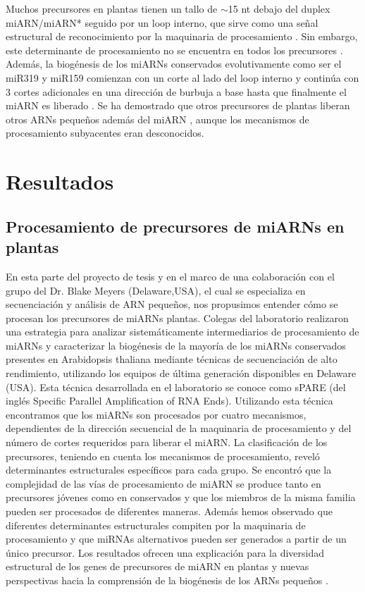 Muchos precursores en plantas tienen un tallo de $\sim$15 nt debajo del duplex miARN/miARN* seguido por un loop interno, que sirve como una señal estructural de reconocimiento por la maquinaria de procesamiento \citep{pmid17369351,pmid16751099,Mateos2010,pmid20015654}.
Sin embargo, este determinante de procesamiento no se encuentra en todos los precursores \citep{Mateos2010}.
Además, la biogénesis de los miARNs conservados evolutivamente como ser el miR319 y miR159 comienzan con un corte al lado del loop interno y continúa con 3 cortes adicionales en una dirección de burbuja a base hasta que finalmente el miARN es liberado \citep{Bologna2013,pmid19850910}.
Se ha demostrado que otros precursores de plantas liberan otros ARNs pequeños además del miARN \citep{pmid15314213,pmid20696037}, aunque los mecanismos de procesamiento subyacentes eran desconocidos.

\section{Resultados} 

\subsection{Procesamiento de precursores de miARNs en plantas}

En esta parte del proyecto de tesis y en el marco de una colaboración con el grupo del Dr. Blake Meyers (Delaware,USA), el cual se especializa en secuenciación y análisis de ARN pequeños, nos propusimos entender cómo se procesan los precursores de miARNs plantas. 
Colegas del laboratorio realizaron una estrategia para analizar sistemáticamente intermediarios de procesamiento de miARNs y caracterizar la biogénesis de la mayoría de los miARNs conservados presentes en Arabidopsis thaliana mediante técnicas de secuenciación de alto rendimiento, utilizando los equipos de última generación disponibles en Delaware (USA).
Esta técnica desarrollada en el laboratorio se conoce como sPARE \citep{Schapire2013} (del inglés Specific Parallel Amplification of RNA Ends).
Utilizando esta técnica encontramos que los miARNs son procesados por cuatro mecanismos, dependientes de la dirección secuencial de la maquinaria de procesamiento y del número de cortes requeridos para liberar el miARN.
La clasificación de los precursores, teniendo en cuenta los mecanismos de procesamiento, reveló determinantes estructurales específicos para cada grupo.
Se encontró que la complejidad de las vías de procesamiento de miARN se produce tanto en precursores jóvenes como en conservados y que los miembros de la misma familia pueden ser procesados de diferentes maneras.
Además hemos observado que diferentes determinantes estructurales compiten por la maquinaria de procesamiento y que miRNAs alternativos pueden ser generados a partir de un único precursor.
Los resultados ofrecen una explicación para la diversidad estructural de los genes de precursores de miARN en plantas y nuevas perspectivas hacia la comprensión de la biogénesis de los ARNs pequeños \citep{Bologna2013}.


